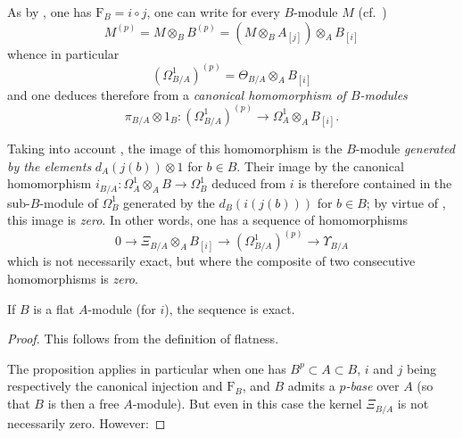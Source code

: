 \begin{env}[21.3.3]
\label{0.21.3.3}
As by , one has $\mathrm{F}_B=i\circ j$, one can write for every $B$-module $M$ (cf.\ )
\begin{equation}
\tag{21.3.3.1}
  \label{0.21.3.3.1}
  M^{(p)}=M\otimes_B B^{(p)}=(M\otimes_B A_{[j]})\otimes_A B_{[i]}
\end{equation}
whence in particular
\begin{equation}
\tag{21.3.3.2}
  \label{0.21.3.3.2}
  (\Omega^1_{B/A})^{(p)}=\Theta_{B/A}\otimes_A B_{[i]}
\end{equation}
and one deduces therefore from  a \emph{canonical homomorphism of $B$-modules}
\begin{equation}
\tag{21.3.3.3}
  \label{0.21.3.3.3}
  \pi_{B/A}\otimes 1_B:(\Omega^1_{B/A})^{(p)}\to\Omega^1_A\otimes_A B_{[i]}.
\end{equation}

Taking into account , the image of this homomorphism is the $B$-module \emph{generated by the elements} $d_A(j(b))\otimes 1$ for $b\in B$.
Their image by the canonical homomorphism $i_{B/A}:\Omega^1_A\otimes_A B\to\Omega^1_B$ deduced from $i$  is therefore contained in the sub-$B$-module of $\Omega^1_B$ generated by the $d_B(i(j(b)))$ for $b\in B$; by virtue of , this image is \emph{zero}.
In other words, one has a sequence of homomorphisms
\begin{equation}
\tag{21.3.3.4}
  \label{0.21.3.3.4}
  0\to\Xi_{B/A}\otimes_A B_{[i]}\to(\Omega^1_{B/A})^{(p)}\to\Upsilon_{B/A}
\end{equation}
which is not necessarily exact, but where the composite of two consecutive homomorphisms is \emph{zero}.
\end{env}

\begin{proposition}[21.3.4]
\label{0.21.3.4}
If $B$ is a flat $A$-module \textup{(}for $i$\textup{)}, the sequence  is exact.
\end{proposition}

\begin{proof}
This follows from the definition of flatness.

The proposition  applies in particular when one has $B^p\subset A\subset B$, $i$ and $j$ being respectively the canonical injection and $\mathrm{F}_B$, and $B$ admits a \emph{$p$-base} over $A$ (so that $B$ is then a free $A$-module).
But even in this case the kernel $\Xi_{B/A}$ is not necessarily zero.
However:
\end{proof}

